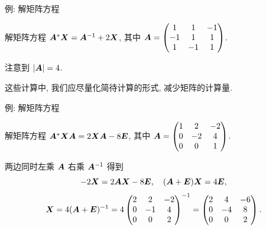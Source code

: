 \begin{frame}{例: 解矩阵方程}
	\onslide<+->
	\begin{example}
		解矩阵方程 ${\boldsymbol{A}}^*{\boldsymbol{X}}={\boldsymbol{A}}^{-1}+2{\boldsymbol{X}}$, 其中 ${\boldsymbol{A}}=\begin{pmatrix}
			1&1&-1\\-1&1&1\\1&-1&1
		\end{pmatrix}$.
	\end{example}
	\onslide<+->
	\begin{solution}
		注意到 $|{\boldsymbol{A}}|=4$.
		\onslide<+->{因此
		\[\bfX=(4\bfE-2\bfA)^{-1}=\begin{pmatrix}
			2&-2&2\\2&2&-2\\-2&2&2
		\end{pmatrix}^{-1}=\frac14\begin{pmatrix}
			1&1&0\\0&1&1\\1&0&1
		\end{pmatrix}.\]}
		\vspace{-\baselineskip}
	\end{solution}
	\onslide<+->
	这些计算中, 我们应尽量化简待计算的形式, 减少矩阵的计算量.
\end{frame}


\begin{frame}{例: 解矩阵方程}
	\onslide<+->
	\begin{exercise}
		解矩阵方程 ${\boldsymbol{A}}^*{\boldsymbol{X}}{\boldsymbol{A}}=2{\boldsymbol{X}}{\boldsymbol{A}}-8{\boldsymbol{E}}$, 其中 ${\boldsymbol{A}}=\begin{pmatrix}
			1&2&-2\\0&-2&4\\0&0&1
		\end{pmatrix}$.
	\end{exercise}
	\onslide<+->
	\begin{answer}
		两边同时左乘 ${\boldsymbol{A}}$ 右乘 ${\boldsymbol{A}}^{-1}$ 得到
		\[-2{\boldsymbol{X}}=2{\boldsymbol{A}}{\boldsymbol{X}}-8{\boldsymbol{E}},\quad ({\boldsymbol{A}}+{\boldsymbol{E}}){\boldsymbol{X}}=4{\boldsymbol{E}},\]
		\[{\boldsymbol{X}}=4({\boldsymbol{A}}+{\boldsymbol{E}})^{-1}=4\begin{pmatrix}
			2&2&-2\\0&-1&4\\0&0&2
		\end{pmatrix}^{-1}=\begin{pmatrix}
			2&4&-6\\0&-4&8\\0&0&2
		\end{pmatrix}.\]
	\end{answer}
\end{frame}


